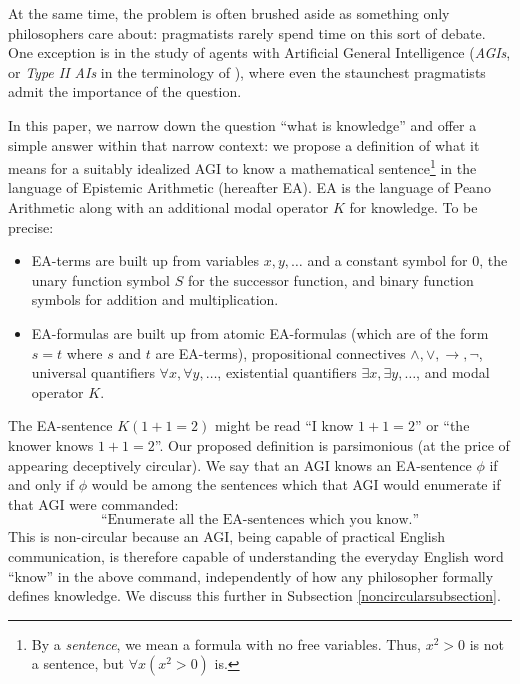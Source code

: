 \documentclass[runningheads]{llncs}
\begin{document}
At the same time, the problem is often brushed aside as something only
philosophers care about: pragmatists rarely spend time
on this sort of debate. One exception is in the study of
agents with Artificial General Intelligence
(\emph{AGIs}, or \emph{Type II AIs} in the
terminology of \cite{aliman2020error}), where even the staunchest
pragmatists admit the importance of the question.

In this paper, we narrow down the question ``what is knowledge'' and offer
a simple answer within that narrow context:
we propose a definition of what it means for a suitably idealized AGI to know
a mathematical sentence\footnote{By a \emph{sentence}, we mean a formula with
no free variables. Thus, $x^2>0$ is not a sentence, but
$\forall x (x^2>0)$ is.} in the language of Epistemic Arithmetic \cite{shapiro} (hereafter
EA). EA is
the language of Peano Arithmetic along with an additional modal operator $K$ for
knowledge. To be precise:
\begin{itemize}
  \item EA-terms are built up from variables $x,y,\ldots$ and a constant symbol for $0$,
  the unary function symbol $S$ for the successor function, and binary function symbols
  for addition and multiplication.
  \item EA-formulas are built up from atomic EA-formulas (which are of the form $s=t$
  where $s$ and $t$ are EA-terms), propositional connectives
  $\wedge,\vee,\rightarrow,\neg$, universal quantifiers $\forall x,\forall y,\ldots$,
  existential quantifiers $\exists x,\exists y,\ldots$, and modal operator $K$.
\end{itemize}
The EA-sentence $K(1+1=2)$ might be read ``I know $1+1=2$''
or ``the knower knows $1+1=2$''. Our
proposed definition is parsimonious (at the price of appearing
deceptively circular). We say that
an AGI knows an EA-sentence $\phi$
if and only if $\phi$ would be among the sentences which that AGI would
enumerate if that AGI were commanded:
\[
\text{``Enumerate all the EA-sentences which you know.''}
\]
This is non-circular because an AGI, being capable of practical English
communication, is therefore capable of understanding the everyday English word
``know'' in the above command, independently of how any philosopher formally
defines knowledge. We discuss this further in Subsection \ref{noncircularsubsection}.
\end{document}
